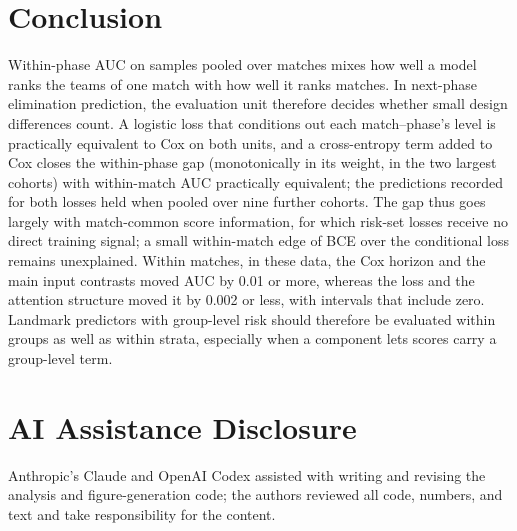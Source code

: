 \documentclass[sigconf,anonymous]{acmart}
\begin{document}
\section{Conclusion}
\label{sec:conclusion}
Within-phase AUC on samples pooled over matches mixes how well a model ranks the teams of one match with how well it ranks matches. In next-phase elimination prediction, the evaluation unit therefore decides whether small design differences count. A logistic loss that conditions out each match--phase's level is practically equivalent to Cox on both units, and a cross-entropy term added to Cox closes the within-phase gap (monotonically in its weight, in the two largest cohorts) with within-match AUC practically equivalent; the predictions recorded for both losses held when pooled over nine further cohorts. The gap thus goes largely with match-common score information, for which risk-set losses receive no direct training signal; a small within-match edge of BCE over the conditional loss remains unexplained. Within matches, in these data, the Cox horizon and the main input contrasts moved AUC by 0.01 or more, whereas the loss and the attention structure moved it by 0.002 or less, with intervals that include zero. Landmark predictors with group-level risk should therefore be evaluated within groups as well as within strata, especially when a component lets scores carry a group-level term.

\section*{AI Assistance Disclosure}
Anthropic's Claude and OpenAI Codex assisted with writing and revising the analysis and figure-generation code; the authors reviewed all code, numbers, and text and take responsibility for the content.



\end{document}
